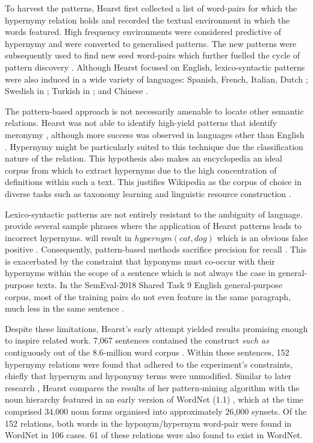 To harvest the patterns, Hearst first collected a list of word-pairs for which the hypernymy relation holds and recorded the textual environment in which the words featured.  High frequency environments were considered predictive of hypernymy and were converted to generalised patterns.  The new patterns were subsequently used to find new seed word-pairs which further fuelled the cycle of pattern discovery \citep{hearst1992automatic}.  Although Hearst focused on English, lexico-syntactic patterns were also induced in a wide variety of languages: Spanish, French, Italian, Dutch \citep{faralli2018misa}; Swedish \citep{rydin2002building} in \citep{sahin2017}; Turkish \citep{sahin2016extraction} in \citep{sahin2017}; and Chinese \citep{Fu2014}.

The pattern-based approach is not necessarily amenable to locate other semantic relations.  Hearst was not able to identify high-yield patterns that identify meronymy \citep{hearst1992automatic}, although more success was observed in languages other than English \citep{sahin2017}.  Hypernymy might be particularly suited to this technique due the classification nature of the relation.  This hypothesis also makes an encyclopedia an ideal corpus from which to extract hypernyms due to the high concentration of definitions within such a text.    This justifies Wikipedia as the corpus of choice in diverse tasks such as taxonomy learning \citep{bordea2016semeval} and linguistic resource construction \citep{Flati2016, Baroni2011}.  

Lexico-syntactic patterns are not entirely resistant to the ambiguity of language.  \citet{wu2012probase} provide several sample phrases where the application of Hearst patterns leads to incorrect hypernyms.   will result in \(hypernym(cat, dog)\) which is an obvious false positive \citep{wu2012probase}.  Consequently, pattern-based methods sacrifice precision for recall \citep{Wang2017, Snow2004, ritter2009anyway}.  This is exacerbated by the constraint that hyponyms must co-occur with their hypernyms within the scope of a sentence which is not always the case in general-purpose texts.  In the SemEval-2018 Shared Task 9 \citep{camacho2018semeval} English general-purpose corpus, most of the training pairs do not even feature in the same paragraph, much less in the same sentence \citep{bernier2018crim}.


Despite these limitations, Hearst’s early attempt yielded results promising enough to inspire related work.  7,067 sentences contained the construct \textit{such as} contiguously out of the 8.6-million word corpus \citep{grolier1990academic}.  Within these sentences, 152 hypernymy relations were found that adhered to the experiment’s constraints, chiefly that hypernym and hyponymy terms were unmodified.  Similar to later research \citep{kozareva2010semi}, Hearst compares the results of her pattern-mining algorithm with the noun hierarchy featured in an early version of WordNet (1.1) \citep{Miller1995}, which at the time comprised 34,000 noun forms organised into approximately 26,000 \ac{synset}s.  Of the 152 relations, both words in the hyponym/hypernym word-pair were found in WordNet in 106 cases.  61 of these relations were also found to exist in WordNet.  


